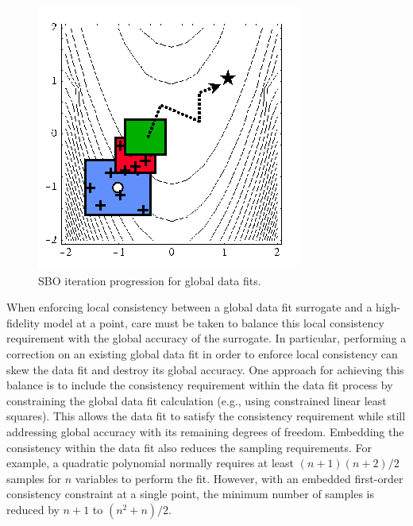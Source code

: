 \begin{figure}
  \centering
  \includegraphics[width=.3\textwidth]{images/sbo_df}
  \caption{SBO iteration progression for global data fits.}
  \label{fig:sbo_df}
\end{figure}
When enforcing local consistency between a global data fit surrogate
and a high-fidelity model at a point, care must be taken to balance
this local consistency requirement with the global accuracy of the
surrogate.  In particular, performing a correction on an existing
global data fit in order to enforce local consistency can skew the
data fit and destroy its global accuracy.  One approach for achieving
this balance is to include the consistency requirement within the data
fit process by constraining the global data fit calculation (e.g.,
using constrained linear least squares).  This allows the data fit to
satisfy the consistency requirement while still addressing global
accuracy with its remaining degrees of freedom.
Embedding the consistency within the data fit also reduces the
sampling requirements.  For example, a quadratic polynomial normally
requires at least $(n+1)(n+2)/2$ samples for $n$ variables to perform
the fit.  However, with an embedded first-order consistency constraint
at a single point, the minimum number of samples is reduced by $n+1$ 
to $(n^2+n)/2$.

